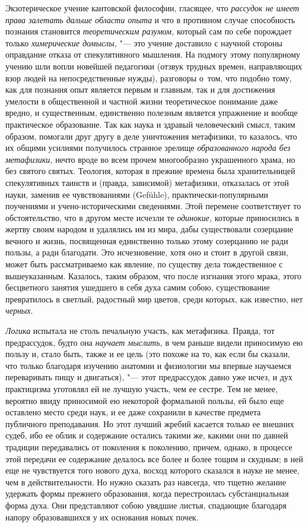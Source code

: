 \label{bkm:Ref474526580}Экзотерическое учение кантовской философии, гласящее,
что {\em рассудок не имеет права залетать дальше области опыта} и что в
противном случае способность познания становится {\em теоретическим разумом,}
который сам по себе порождает только {\em химерические домыслы,} "--- это
учение доставило с научной стороны оправдание отказа от спекулятивного
мышления. На подмогу этому популярному учению шли вопли новейшей педагогики
(отзвук трудных времен, направляющих взор людей на непосредственные нужды),
разговоры о~том, что подобно тому, как для познания опыт является первым и
главным, так и для достижения умелости в общественной и частной жизни
теоретическое понимание даже вредно, и существенным, единственно полезным
является упражнение и вообще практическое образование. Так как наука и здравый
человеческий смысл, таким образом, помогали друг другу в деле уничтожения
метафизики, то казалось, что их общими усилиями получилось странное зрелище
{\em образованного народа без метафизики,} нечто вроде во всем прочем
многообразно украшенного храма, но без святого святых. Теология, которая в
прежние времена была хранительницей спекулятивных таинств и (правда, зависимой)
метафизики, отказалась от этой науки, заменив ее чувствованиями (Gefühle),
практически-популярными поучениями и учено-историческими сведениями. Этой
перемене соответствует то обстоятельство, что в другом месте исчезли те
{\em одинокие,} которые приносились в жертву своим народом и удалялись им из
мира, дабы существовали созерцание вечного и жизнь, посвященная единственно
только этому созерцанию не ради пользы, а ради благодати. Это исчезновение,
хотя оно и стоит в другой связи, может быть рассматриваемо как явление, по
существу дела тождественное с вышеуказанным. Казалось, таким образом, что после
изгнания этого мрака, этого бесцветного занятия ушедшего в себя духа самим
собою, существование превратилось в светлый, радостный мир цветов, среди
которых, как известно, нет {\em черных}.

{\em Логика} испытала не столь печальную участь, как метафизика. Правда, тот
предрассудок, будто она {\em научает мыслить,} в чем раньше видели приносимую
ею пользу и, стало быть, также и ее цель (это похоже на то, как если бы
сказали, что только благодаря изучению анатомии и физиологии мы впервые
научаемся переваривать пищу и двигаться), "--- этот предрассудок давно уже
исчез, и дух практицизма уготовлял ей не лучшую участь, чем ее сестре. Тем не
менее, вероятно ввиду приносимой ею некоторой формальной пользы, ей было еще
оставлено место среди наук, и ее даже сохранили в качестве предмета публичного
преподавания. Но этот лучший жребий касается только ее внешних судеб, ибо ее
облик и содержание остались такими же, какими они по давней традиции
передавались от поколения к поколению, причем, однако, в процессе этой передачи
ее содержание делалось все более и более тощим и скудным; в ней еще не
чувствуется того нового духа, восход которого сказался в науке не менее, чем в
действительности. Но нужно сказать раз навсегда, что тщетно желание удержать
формы прежнего образования, когда перестроилась субстанциальная форма духа. Они
представляют собою увядшие листья, спадающие благодаря напору образовавшихся у
их основания новых почек.

